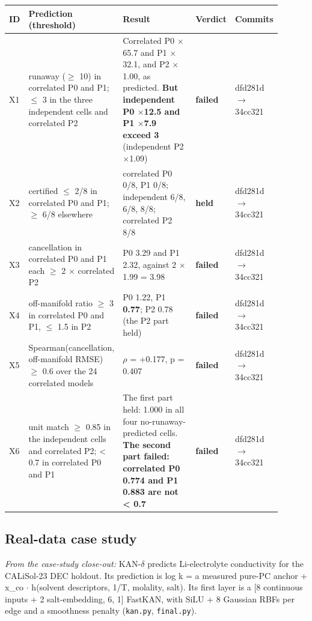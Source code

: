 {\footnotesize\setlength{\tabcolsep}{3pt}
\begin{longtable}{R{0.07\linewidth} R{0.28\linewidth} R{0.35\linewidth} R{0.09\linewidth} R{0.11\linewidth}}
\toprule
ID & Prediction (threshold) & Result & Verdict & Commits \\
\midrule
\endhead
X1 & runaway ($\geq$ 10) in correlated P0 and P1; $\leq$ 3 in the three independent cells and correlated P2 & Correlated P0 $\times$65.7 and P1 $\times$32.1, and P2 $\times$1.00, as predicted. \textbf{But independent P0 $\times$12.5 and P1 $\times$7.9 exceed 3} (independent P2 $\times$1.09) & \textbf{failed} & dfd281d$\to$\allowbreak 34cc321 \\
X2 & certified $\leq$ 2/8 in correlated P0 and P1; $\geq$ 6/8 elsewhere & correlated P0 0/8, P1 0/8; independent 6/8, 6/8, 8/8; correlated P2 8/8 & \textbf{held} & dfd281d$\to$\allowbreak 34cc321 \\
X3 & cancellation in correlated P0 and P1 each $\geq$ 2 $\times$ correlated P2 & P0 3.29 and P1 2.32, against 2 $\times$ 1.99 = 3.98 & \textbf{failed} & dfd281d$\to$\allowbreak 34cc321 \\
X4 & off-manifold ratio $\geq$ 3 in correlated P0 and P1, $\leq$ 1.5 in P2 & P0 1.22, P1 \textbf{0.77}; P2 0.78 (the P2 part held) & \textbf{failed} & dfd281d$\to$\allowbreak 34cc321 \\
X5 & Spearman(cancellation, off-manifold RMSE) $\geq$ 0.6 over the 24 correlated models & $\rho$ = +0.177, p = 0.407 & \textbf{failed} & dfd281d$\to$\allowbreak 34cc321 \\
X6 & unit match $\geq$ 0.85 in the independent cells and correlated P2; < 0.7 in correlated P0 and P1 & The first part held: 1.000 in all four no-runaway-predicted cells. \textbf{The second part failed: correlated P0 0.774 and P1 0.883 are not < 0.7} & \textbf{failed} & dfd281d$\to$\allowbreak 34cc321 \\
\bottomrule
\end{longtable}}
\subsection{Real-data case study}
\noindent\textit{From the case-study close-out:} KAN-$\delta$ predicts Li-electrolyte conductivity for the CALiSol-23 DEC holdout. Its
prediction is log k = a measured pure-PC anchor + x\_co $\cdot$ h(solvent descriptors, 1/T, molality, salt).
Its first layer is a [8 continuous inputs + 2 salt-embedding, 6, 1] FastKAN, with SiLU + 8 Gaussian
RBFs per edge and a smoothness penalty (\texttt{kan.py}, \texttt{final.py}).

